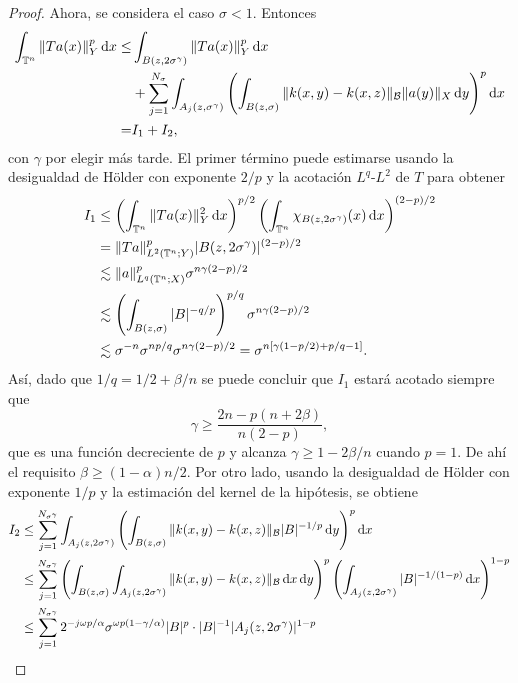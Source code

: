 \begin{proof}
	Ahora, se considera el caso $\sigma<1$. Entonces 
	\begin{align*}
		\int_{\mathbb{T}^n}\|Ta(x)\|^p_Y \mathop{}\!\mathrm{d} x \leq & \int_{B(z,2\sigma^\gamma)}\|Ta(x)\|^p_Y \mathop{}\!\mathrm{d} x \\ 
		& + \sum_{j=1}^{N_\sigma} \int_{A_j(z,\sigma^\gamma)}\left( \int_{B(z,\sigma)} \|k(x, y) - k(x, z)\|_\mathcal{B} \|a(y)\|_X 
		\mathop{}\!\mathrm{d} y\right)^p \mathop{}\!\mathrm{d} x \\
		= & I_1 + I_2,
	\end{align*}
	con $\gamma$ por elegir más tarde.  El primer término puede estimarse usando la desigualdad de H\"older con exponente $2/p$ y la acotación $L^q$-$L^2$ de $T$ para obtener
	\begin{align*}
		I_1 &\leq \left( \int_{\mathbb{T}^n} \|Ta(x)\|_Y^2\mathop{}\!\mathrm{d} x \right)^{p/2}\left( \int_{\mathbb{T}^n} \chi_{B(z,2\sigma^\gamma)}(x)\mathop{}\!\mathrm{d} x \right)^{(2-p)/2} \\
		&= \|Ta\|_{L^2(\mathbb{T}^n;Y)}^p|B(z,2\sigma^\gamma)|^{(2-p)/2} \\
		 & \lesssim\|a\|_{L^q(\mathbb{T}^n;X)}^p\sigma^{n\gamma(2-p)/2} \\
		 & \lesssim\left( \int_{B(z, \sigma)}|B|^{-q/p} \right)^{p/q}\sigma^{n\gamma(2-p)/2}  \\
		 & \lesssim\sigma^{-n}\sigma^{np/q}\sigma^{n\gamma(2-p)/2} = \sigma^{n[\gamma(1-p/2) +p/q-1]}.
	\end{align*}
	Así, dado que $1/q=1/2+\beta/n$ se puede concluir que $I_1$ estará acotado siempre que 
	\begin{equation}
		\gamma \geq \frac{2n - p(n + 2\beta)}{n(2-p)}, 
		\label{eq:gamma-lowe-bound}
	\end{equation}
	que es una función decreciente de $p$ y alcanza $\gamma\geq1-2\beta/n$ cuando $p=1$. De ahí el requisito $\beta \geq (1-\alpha) n/2$.
	Por otro lado, usando la desigualdad de H\"older con exponente $1/p$ y la estimación del kernel de la hipótesis, se obtiene 
	\begin{align*}
		I_2  &\leq \sum_{j=1}^{N_{\sigma^\gamma}}\int_{A_j(z,2\sigma^\gamma)}\left( \int_{B(z,\sigma)} \|k(x, y) - k(x, z)\|_\mathcal{B} |B|^{-1/p} 
		\diff y\right)^p \diff x \\
		 &\leq \sum_{j=1}^{N_{\sigma^\gamma}} \left(\int_{B(z,\sigma)} \int_{A_j(z,2\sigma^\gamma)} \|k(x, y) - k(x, z)\|_\mathcal{B} \diff x\diff y \right)^p \left( \int_{A_j(z,2\sigma^\gamma)} |B|^{-1/(1-p)} \diff x \right)^{1-p} \\
		 &\leq \sum_{j=1}^{N_{\sigma^\gamma}}  2^{-j\omega p/\alpha}\sigma^{\omega p(1-\gamma/\alpha)}|B|^p \cdot |B|^{-1}|A_j(z, 2\sigma^\gamma)|^{1-p} \\

\end{align*}
\end{proof}
